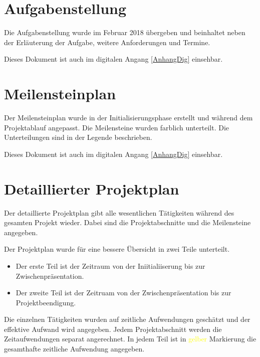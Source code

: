 \appendix

\chapter{Aufgabenstellung}
\label{AnhangAufgabenstellung}

Die Aufgabenstellung wurde im Februar 2018 übergeben und beinhaltet neben der Erläuterung der Aufgabe, weitere Anforderungen und Termine.

Dieses Dokument ist auch im digitalen Angang \ref{AnhangDig} einsehbar.



\chapter{Meilensteinplan}
Der Meilensteinplan wurde in der Initialisierungsphase erstellt und während dem Projektablauf angepasst. Die Meilensteine wurden farblich unterteilt. Die Unterteilungen sind in der Legende beschrieben. 

Dieses Dokument ist auch im digitalen Angang \ref{AnhangDig} einsehbar.

\label{AnhangA}


\chapter{Detaillierter Projektplan}
\label{AnhangB}

Der detaillierte Projektplan gibt alle wesentlichen Tätigkeiten während des gesamten Projekt wieder. Dabei sind die Projektabschnitte und die Meilensteine angegeben.

Der Projektplan wurde für eine bessere Übersicht in zwei Teile unterteilt. 
\begin{itemize}
\item Der erste Teil ist der Zeitraum von der Iniitialiiserung bis zur Zwischenpräsentation.

\item Der zweite Teil ist der Zeitruam von der Zwischenpräsentation bis zur Projektbeendigung.

\end{itemize}

Die einzelnen Tätigkeiten wurden auf zeitliche Aufwendungen geschätzt und der effektive Aufwand wird angegeben. 
Jedem Projektabschnitt werden die Zeitaufwendungen separat angerechnet. In jedem Teil ist in \textcolor{yellow}{gelber} Markierung die gesamthafte zeitliche Aufwendung angegeben.


